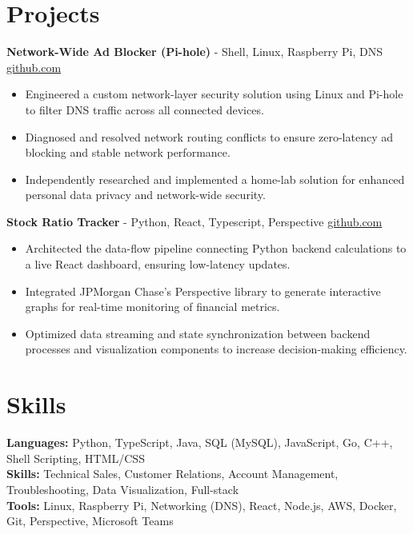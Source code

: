 \documentclass[11pt]{article}       %
\begin{document}
\vspace{-18.5pt}

\section*{Projects}

\textbf{Network-Wide Ad Blocker (Pi-hole)}{ - Shell, Linux, Raspberry Pi, DNS} \hfill \href{https://github.com/Monica20030707}{github.com} \\
\vspace{-9pt}
\begin{itemize}
  \item Engineered a custom network-layer security solution using Linux and Pi-hole to filter DNS traffic across all connected devices.
  \item Diagnosed and resolved network routing conflicts to ensure zero-latency ad blocking and stable network performance.
  \item Independently researched and implemented a home-lab solution for enhanced personal data privacy and network-wide security.
\end{itemize}

\textbf{Stock Ratio Tracker}{ - Python, React, Typescript, Perspective} \hfill \href{https://github.com/Monica20030707/tradingDashboard-UI}{github.com} \\
\vspace{-9pt}
\begin{itemize}
  \item Architected the data-flow pipeline connecting Python backend calculations to a live React dashboard, ensuring low-latency updates. 
  \item Integrated JPMorgan Chase’s Perspective library to generate interactive graphs for real-time monitoring of financial metrics.
  \item Optimized data streaming and state synchronization between backend processes and visualization components to increase decision-making efficiency.
\end{itemize}

\vspace{-18.5pt}


\section*{Skills}
\textbf{Languages:} Python, TypeScript, Java, SQL (MySQL), JavaScript, Go, C++, Shell Scripting, HTML/CSS\\
\textbf{Skills:} Technical Sales, Customer Relations, Account Management, Troubleshooting, Data Visualization, Full-stack\\
\textbf{Tools:} Linux, Raspberry Pi, Networking (DNS), React, Node.js, AWS, Docker, Git, Perspective, Microsoft Teams\\

\vspace{-6.5pt}
\end{document}
